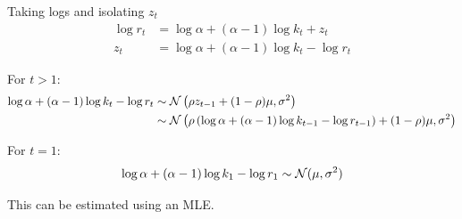 \documentclass[12pt, letterpaper]{paper}
\begin{document}
Taking logs and isolating $z_t$
\begin{align*}
  \log r_t  &= \log \alpha + (\alpha-1) \log k_t + z_t\\
  z_t &= \log \alpha + (\alpha-1) \log k_t - \log r_t
\end{align*}

For $t > 1$:
\begin{align*}
  \log \alpha + (\alpha-1) \log k_t - \log r_t &\sim \mathcal{N}\left( \rho z_{t-1} +
                                       (1-\rho)\mu, \sigma^2 \right)\\
  &\sim \mathcal{N}\left( \rho\left( \log \alpha + (\alpha-1)\log k_{t-1} - \log r_{t-1}
    \right) + (1-\rho)\mu, \sigma^2 \right)
\end{align*}

For $t = 1$:
\begin{equation*}
  \log \alpha + (\alpha-1)\log k_1 - \log r_1 \sim \mathcal{N}( \mu, \sigma^2)
\end{equation*}

This can be estimated using an MLE.
\end{document}
